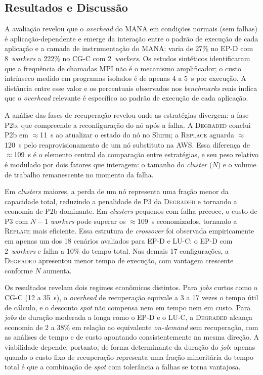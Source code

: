 \begin{resumo}
\section*{Resultados e Discussão}

A avaliação revelou que o \textit{overhead} do MANA em condições normais
(sem falhas) é aplicação-dependente e emerge da interação entre o padrão de
execução de cada aplicação e a camada de instrumentação do MANA: varia de 27\%
no EP-D com 8~\textit{workers} a 222\% no CG-C com 2~\textit{workers}. Os
estudos sintéticos identificaram que a frequência de chamadas MPI não é o
mecanismo amplificador; o custo intrínseco medido em programas isolados é de
apenas 4 a 5~s por execução. A distância entre esse valor e os percentuais
observados nos \textit{benchmarks} reais indica que o \textit{overhead} relevante
é específico ao padrão de execução de cada aplicação.

A análise das fases de recuperação revelou onde as estratégias divergem: a fase
P2b, que compreende a reconfiguração do nó após a falha. A \textsc{Degraded}
conclui P2b em $\approx$11~s ao atualizar o estado do nó no Slurm; a
\textsc{Replace} aguarda $\approx$120~s pelo reaprovisionamento de um nó
substituto na AWS. Essa diferença de $\approx$109~s é o elemento central da
comparação entre estratégias, e seu peso relativo é modulado por dois fatores
que interagem: o tamanho do \textit{cluster} ($N$) e o volume de trabalho
remanescente no momento da falha.

Em \textit{clusters} maiores, a perda de um nó representa uma fração menor da
capacidade total, reduzindo a penalidade de P3 da \textsc{Degraded} e tornando
a economia de P2b dominante. Em \textit{clusters} pequenos com falha precoce, o
custo de P3 com $N{-}1$ \textit{workers} pode superar os $\approx$109~s
economizados, tornando a \textsc{Replace} mais eficiente. Essa estrutura de
\textit{crossover} foi observada empiricamente em apenas um dos 18 cenários
avaliados para EP-D e LU-C: o EP-D com 2~\textit{workers} e falha a 10\% do
tempo total. Nas demais 17 configurações, a \textsc{Degraded} apresentou menor
tempo de execução, com vantagem crescente conforme $N$ aumenta.

Os resultados revelam dois regimes econômicos distintos. Para \textit{jobs}
curtos como o CG-C (12 a 35~s), o \textit{overhead} de recuperação equivale a
3 a 17 vezes o tempo útil de cálculo, e o desconto \textit{spot} não compensa
nem em tempo nem em custo. Para \textit{jobs} de duração moderada a longa como
o EP-D e o LU-C, a \textsc{Degraded} alcança economia de 2 a 38\% em relação
ao equivalente \textit{on-demand} sem recuperação, com as análises de tempo e
de custo apontando consistentemente na mesma direção. A viabilidade depende,
portanto, de forma determinante da duração do \textit{job}: apenas quando o
custo fixo de recuperação representa uma fração minoritária do tempo total é que
a combinação de \textit{spot} com tolerância a falhas se torna vantajosa.



\end{resumo}
